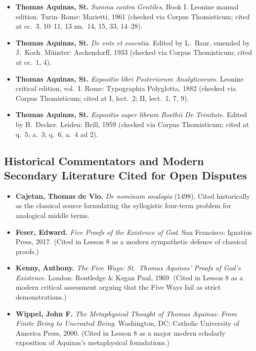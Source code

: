 \begin{itemize}
\item \textbf{Thomas Aquinas, St.} \emph{Summa contra Gentiles}, Book I. Leonine manual edition. Turin--Rome: Marietti, 1961 (checked via Corpus Thomisticum; cited at cc.\ 3, 10--11, 13 nn.\ 14, 15, 33, 14--28).
\item \textbf{Thomas Aquinas, St.} \emph{De ente et essentia}. Edited by L.\ Baur, emended by J.\ Koch. M\"unster: Aschendorff, 1933 (checked via Corpus Thomisticum; cited at cc.\ 1, 4).
\item \textbf{Thomas Aquinas, St.} \emph{Expositio libri Posteriorum Analyticorum}. Leonine critical edition, vol.\ I. Rome: Typographia Polyglotta, 1882 (checked via Corpus Thomisticum; cited at I, lect.\ 2; II, lect.\ 1, 7, 9).
\item \textbf{Thomas Aquinas, St.} \emph{Expositio super librum Boethii De Trinitate}. Edited by B.\ Decker. Leiden: Brill, 1959 (checked via Corpus Thomisticum; cited at q.\ 5, a.\ 3; q.\ 6, a.\ 4 ad 2).
\end{itemize}

\subsection*{Historical Commentators and Modern Secondary Literature Cited for Open Disputes}

\begin{itemize}
\item \textbf{Cajetan, Thomas de Vio.} \emph{De nominum analogia} (1498). Cited historically as the classical source formulating the syllogistic four-term problem for analogical middle terms.
\item \textbf{Feser, Edward.} \emph{Five Proofs of the Existence of God}. San Francisco: Ignatius Press, 2017. (Cited in Lesson 8 as a modern sympathetic defence of classical proofs.)
\item \textbf{Kenny, Anthony.} \emph{The Five Ways: St.\ Thomas Aquinas' Proofs of God's Existence}. London: Routledge \& Kegan Paul, 1969. (Cited in Lesson 8 as a modern critical assessment arguing that the Five Ways fail as strict demonstrations.)
\item \textbf{Wippel, John F.} \emph{The Metaphysical Thought of Thomas Aquinas: From Finite Being to Uncreated Being}. Washington, DC: Catholic University of America Press, 2000. (Cited in Lesson 8 as a major modern scholarly exposition of Aquinas's metaphysical foundations.)
\end{itemize}
